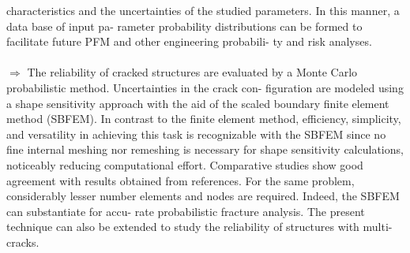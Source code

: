 \documentclass[12pt]{article}
\begin{document}
characteristics and the uncertainties of the studied
parameters. In this manner, a data base of input pa-
rameter probability distributions can be formed to
facilitate future PFM and other engineering probabili-
ty and risk analyses.
\\\\$\Rightarrow$ The reliability of cracked structures are evaluated by a Monte Carlo probabilistic method. Uncertainties in the crack con-
figuration are modeled using a shape sensitivity approach with the aid of the scaled boundary finite element method
(SBFEM). In contrast to the finite element method, efficiency, simplicity, and versatility in achieving this task is recognizable
with the SBFEM since no fine internal meshing nor remeshing is necessary for shape sensitivity calculations, noticeably
reducing computational effort. Comparative studies show good agreement with results obtained from references. For the
same problem, considerably lesser number elements and nodes are required. Indeed, the SBFEM can substantiate for accu-
rate probabilistic fracture analysis. The present technique can also be extended to study the reliability of structures with
multi-cracks.
\end{document}
